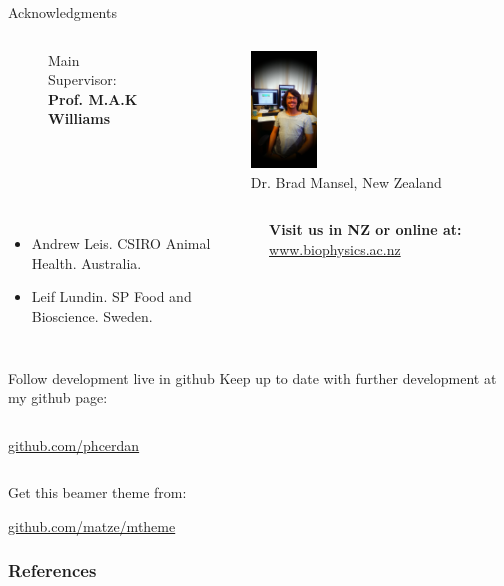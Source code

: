 \documentclass[9pt]{beamer}
\begin{document}
\begin{frame}{Acknowledgments}
\begin{columns}[onlytextwidth]
\begin{figure}[htpb]
  \caption*{Main Supervisor: \textbf{Prof. M.A.K Williams}}
\end{figure}
    \begin{figure}[htpb]
      \centering
      \includegraphics[width=0.3\textwidth]{./Figures/people/brad.png}
      \caption*{Dr. Brad Mansel, New Zealand}
    \end{figure}
  \end{columns}
  \begin{columns}[onlytextwidth]
    \begin{itemize}
      \item Andrew Leis. CSIRO Animal Health. Australia.
      \item Leif Lundin. SP Food and Bioscience. Sweden.
    \end{itemize}
    \textbf{Visit us in NZ or online at:}\newline
        \url{www.biophysics.ac.nz}
  \end{columns}
\end{frame}
\begin{frame}{Follow development live in github}
  Keep up to date with further development at my github page:
  \vspace{2mm}
  \begin{columns}[onlytextwidth]
      \begin{center}\url{github.com/phcerdan}\end{center}
  \end{columns}


  \vspace{2mm}
  Get this beamer theme from:

  \begin{center}\url{github.com/matze/mtheme}\end{center}

  \begin{center}\ccbysa\end{center}

\end{frame}
\begin{frame}[allowframebreaks]

  \frametitle{References}

  
  

\end{frame}
\end{document}
